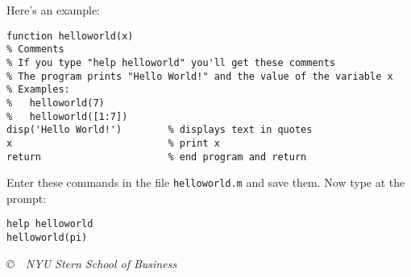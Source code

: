 \documentclass[11pt]{exam}
\begin{document}
\begin{questions}
Here's an example:
\begin{verbatim}
function helloworld(x)
% Comments
% If you type "help helloworld" you'll get these comments
% The program prints "Hello World!" and the value of the variable x
% Examples:
%   helloworld(7)
%   helloworld([1:7])
disp('Hello World!')        % displays text in quotes
x                           % print x
return                      % end program and return
\end{verbatim}
Enter these commands in the file {\tt helloworld.m} and save them.
Now type at the prompt:
\begin{verbatim}
help helloworld
helloworld(pi)
\end{verbatim}

\end{questions}

\vfill \centerline{\it \copyright \ \number\year \
NYU Stern School of Business}
\end{document}
